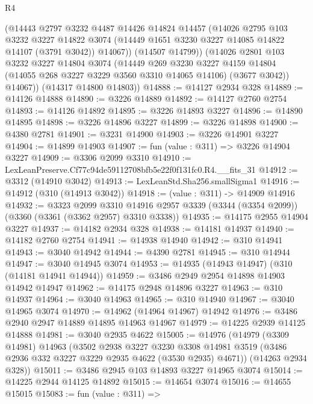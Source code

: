 \begin{lexlean}{R4}
\begin{coremodule}
          (@14443
            @2797
            @3232
            @4487
            @14426
            @14824
            @14457
            (@14026
              @2795
              @103
              @3232
              @3227
              @14822
              @3074
              (@14449 @1651 @3230 @3227 @14085 @14822 @14107 (@3791 @3042))
              @14067))
          (@14507 @14799))
        (@14026
          @2801
          @103
          @3232
          @3227
          @14804
          @3074
          (@14449
            @269
            @3230
            @3227
            @4159
            @14804
            (@14055 @268 @3227 @3229 @3560 @3310 @14065 @14106)
            (@3677 @3042))
          @14067))
      (@14317 @14800 @14803))
@14888 := @14127 @2934 @328
@14889 := @14126 @14888
@14890 := @3226 @14889
@14892 := @14127 @2760 @2754
@14893 := @14126 @14892
@14895 := @3226 @14893 @3227
@14896 := @14890 @14895
@14898 := @3226 @14896 @3227
@14899 := @3226 @14898
@14900 := @4380 @2781
@14901 := @3231 @14900
@14903 := @3226 @14901 @3227
@14904 := @14899 @14903
@14907 := fun (value : @311) => @3226 @14904 @3227
@14909 := @3306 @2099 @3310
@14910 := LexLeanPreserve.Cf77c94de59112708bfb5e22f0f131fc0.R4.__fits_31
@14912 := @3312 (@14910 @3042)
@14913 := LexLeanStd.Sha256.smallSigma1
@14916 := @14912 (@310 (@14913 @3042))
@14918 := (value : @311) -> @14909 @14916
@14932 := @3323
    @2099
    @3310
    @14916
    @2957
    @3339
    (@3344 (@3354 @2099))
    (@3360 (@3361 (@3362 @2957) @3310 @3338))
@14935 := @14175 @2955 @14904 @3227
@14937 := @14182 @2934 @328
@14938 := @14181 @14937
@14940 := @14182 @2760 @2754
@14941 := @14938 @14940
@14942 := @310 @14941
@14943 := @3040 @14942
@14944 := @4390 @2781
@14945 := @310 @14944
@14947 := @3040 @14945 @3074
@14953 := @14935 (@14943 @14947) (@310 (@14181 @14941 @14944))
@14959 := @3486 @2949 @2954 @14898 @14903 @14942 @14947
@14962 := @14175 @2948 @14896 @3227
@14963 := @310 @14937
@14964 := @3040 @14963
@14965 := @310 @14940
@14967 := @3040 @14965 @3074
@14970 := @14962 (@14964 @14967) @14942
@14976 := @3486 @2940 @2947 @14889 @14895 @14963 @14967
@14979 := @14225 @2939 @14125 @14888
@14981 := @3040 @2935 @4622
@15005 := @14976
    (@14979
      (@3309 @14981)
      @14963
      (@3502
        @2938
        @3227
        @3230
        @3308
        @14981
        @3519
        (@3486 @2936 @332 @3227 @3229 @2935 @4622 (@3530 @2935) @4671))
      (@14263 @2934 @328))
@15011 := @3486 @2945 @103 @14893 @3227 @14965 @3074
@15014 := @14225 @2944 @14125 @14892
@15015 := @14654 @3074
@15016 := @14655 @15015
@15083 := fun (value : @311) =>

\end{coremodule}
\end{lexlean}
